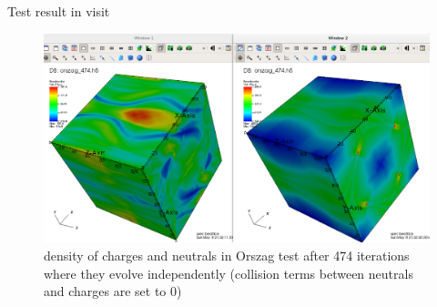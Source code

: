 \documentclass{beamer}
\begin{document}
\begin{frame}{Test result in visit}
\begin{figure}[H]
 \centering
 \includegraphics[scale=0.24]{visit.png}
  \caption{density of charges and neutrals in Orszag test after 474 iterations where they evolve independently (collision terms between neutrals and charges are set to 0)}
\end{figure}
\end{frame}
\end{document}
